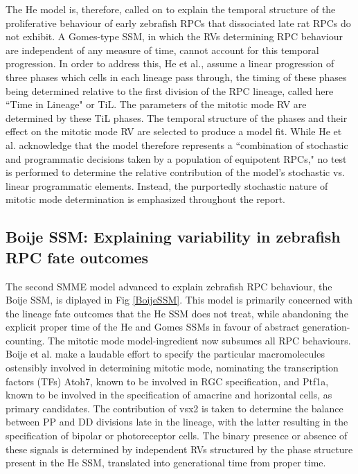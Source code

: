 The He model is, therefore, called on to explain the temporal structure of the proliferative behaviour of early zebrafish RPCs that dissociated late rat RPCs do not exhibit. A Gomes-type SSM, in which the RVs determining RPC behaviour are independent of any measure of time, cannot account for this temporal progression. In order to address this, He et al., assume a linear progression of three phases which cells in each lineage pass through, the timing of these phases being determined relative to the first division of the RPC lineage, called here ``Time in Lineage" or TiL. The parameters of the mitotic mode RV are determined by these TiL phases. The temporal structure of the phases and their effect on the mitotic mode RV are selected to produce a model fit. While He et al. acknowledge that the model therefore represents a ``combination of stochastic and programmatic decisions taken by a population of equipotent RPCs," no test is performed to determine the relative contribution of the model's stochastic vs. linear programmatic elements. Instead, the purportedly stochastic nature of mitotic mode determination is emphasized throughout the report.

 \subsection{Boije SSM: Explaining variability in zebrafish RPC fate outcomes}
 
The second SMME model advanced to explain zebrafish RPC behaviour, the Boije SSM, is diplayed in Fig \ref{BoijeSSM}. This model is primarily concerned with the lineage fate outcomes that the He SSM does not treat, while abandoning the explicit proper time of the He and Gomes SSMs in favour of abstract generation-counting. The mitotic mode model-ingredient now subsumes all RPC behaviours. Boije et al. make a laudable effort to specify the particular macromolecules ostensibly involved in determining mitotic mode, nominating the transcription factors (TFs) Atoh7, known to be involved in RGC specification, and Ptf1a, known to be involved in the specification of amacrine and horizontal cells, as primary candidates. The contribution of vsx2 is taken to determine the balance between PP and DD divisions late in the lineage, with the latter resulting in the specification of bipolar or photoreceptor cells. The binary presence or absence of these signals is determined by independent RVs structured by the phase structure present in the He SSM, translated into generational time from proper time.

